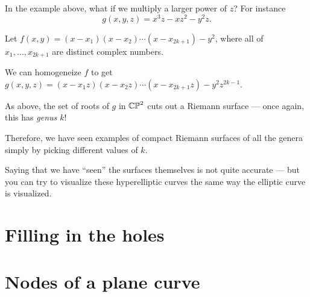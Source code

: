 \begin{exercise}
	In the example above, what if we multiply a larger power of $z$? For instance
	\[ g(x, y, z) = x^3 z-xz^2-y^2 z. \]
\end{exercise}

\begin{example}
	Let $f(x, y) = (x-x_1)(x-x_2) \dotsm (x-x_{2k+1}) - y^2$, where all of $x_1, \dots, x_{2k+1}$ are
	distinct complex numbers.

	We can homogeneize $f$ to get $g(x, y, z) = (x-x_1 z)(x-x_2 z) \dotsm (x-x_{2k+1} z) - y^2
	z^{2k-1}$.

	As above, the set of roots of $g$ in $\mathbb{CP}^2$ cuts out a Riemann surface --- once again, this has
	\emph{genus $k$}!

	Therefore, we have seen examples of compact Riemann surfaces of all the genera simply by picking
	different values of $k$.
\end{example}
Saying that we have ``seen'' the surfaces themselves is not quite accurate ---
but you can try to visualize these hyperelliptic curves the same way the elliptic curve is
visualized.

\section{Filling in the holes}

\section{Nodes of a plane curve}

